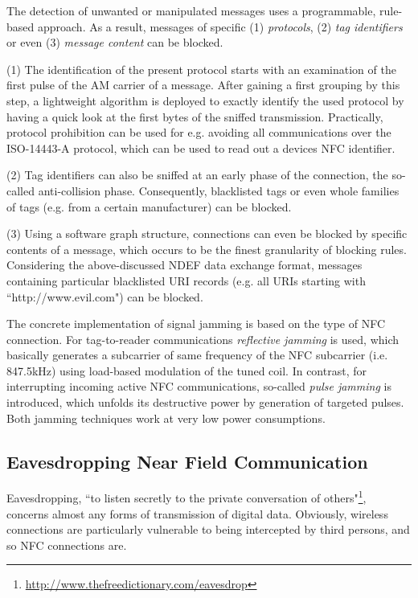 \documentclass[12pt,a4paper]{article}
\begin{document}
The detection of unwanted or manipulated messages uses a programmable, rule-based approach. As a result, messages of specific (1) \emph{protocols}, (2) \emph{tag identifiers} or even (3) \emph{message content} can be blocked.

(1) The identification of the present protocol starts with an examination of the first pulse of the AM carrier of a message. After gaining a first grouping by this step, a lightweight algorithm is deployed to exactly identify the used protocol by having a quick look at the first bytes of the sniffed transmission. Practically, protocol prohibition can be used for e.g. avoiding all communications over the ISO-14443-A protocol, which can be used to read out a devices NFC identifier.

(2) Tag identifiers can also be sniffed at an early phase of the connection, the so-called anti-collision phase. Consequently, blacklisted tags or even whole families of tags (e.g. from a certain manufacturer) can be blocked.

(3) Using a software graph structure, connections can even be blocked by specific contents of a message, which occurs to be the finest granularity of blocking rules. Considering the above-discussed NDEF data exchange format, messages containing particular blacklisted URI records (e.g. all URIs starting with ``http://www.evil.com") can be blocked.

The concrete implementation of signal jamming is based on the type of NFC connection. For tag-to-reader communications \emph{reflective jamming} is used, which basically generates a subcarrier of same frequency of the NFC subcarrier (i.e. 847.5kHz) using load-based modulation of the tuned coil. In contrast, for interrupting incoming active NFC communications, so-called \emph{pulse jamming} is introduced, which unfolds its destructive power by generation of targeted pulses. Both jamming techniques work at very low power consumptions.

\subsection{Eavesdropping Near Field Communication}

Eavesdropping, ``to listen secretly to the private conversation of others"\footnote{\url{http://www.thefreedictionary.com/eavesdrop}}, concerns almost any forms of transmission of digital data. Obviously, wireless connections are particularly vulnerable to being intercepted by third persons, and so NFC connections are. \cite{DBLP:conf/icitst/EvestiSS13}
\end{document}
